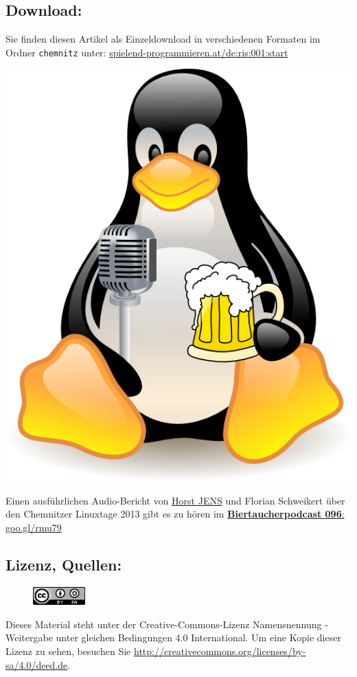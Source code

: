 \subsection*{Download:}
Sie finden diesen Artikel als Einzeldownload in verschiedenen Formaten im Ordner \texttt{chemnitz} unter: 
\href{http://spielend-programmieren.at/de:ris:001:start}{spielend-programmieren.at/de:ris:001:start} 
\begin{center}
\includegraphics[width=0.5linewidth]{chemnitz-biertaucherlogo.png}
\end{center}
Einen ausführlichen Audio-Bericht von \href{http://spielend-programmieren.at}{Horst JENS} und Florian Schweikert über den Chemnitzer Linuxtage 2013  gibt es zu hören im \href{http://spielend-programmieren.at/de:podcast:biertaucher:2013:096}{\textbf{Biertaucherpodcast 096}: goo.gl/rmu79} \\

\subsection*{Lizenz, Quellen:}
\begin{figure}
\includegraphics[width=2cm]{ccbysa88x31.png}
\end{figure}
Dieses Material steht unter der Creative-Commons-Lizenz Namensnennung - Weitergabe unter gleichen Bedingungen 4.0 International. Um eine Kopie dieser Lizenz zu sehen, besuchen Sie \url{http://creativecommons.org/licenses/by-sa/4.0/deed.de}. \\

